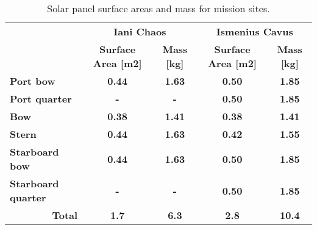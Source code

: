 \begin{table}[h]
\footnotesize
\centering
\caption[Solar panel surface areas and mass for mission sites]
    {Solar panel surface areas and mass for mission sites.}
\label{tab:solar-panel-surface-areas}
\begin{tabular}{l|c|c|c|c|}
\cline{2-5}
\textbf{} & \multicolumn{2}{c|}{\textbf{Iani Chaos}} & \multicolumn{2}{c|}{\textbf{Ismenius Cavus}} \\ \cline{2-5}
 & \textbf{Surface Area {[}m2{]}} & \textbf{Mass {[}kg{]}} & \textbf{Surface Area {[}m2{]}} & \textbf{Mass {[}kg{]}} \\ \hline
\multicolumn{1}{|l|}{{\color[HTML]{A6DBA0} \textbf{Port bow}}} & {\color[HTML]{A6DBA0} \textbf{0.44}} & {\color[HTML]{A6DBA0} \textbf{1.63}} & {\color[HTML]{A6DBA0} \textbf{0.50}} & {\color[HTML]{A6DBA0} \textbf{1.85}} \\ \hline
\multicolumn{1}{|l|}{{\color[HTML]{5AAE61} \textbf{Port quarter}}} & {\color[HTML]{5AAE61} \textbf{-}} & {\color[HTML]{5AAE61} \textbf{-}} & {\color[HTML]{5AAE61} \textbf{0.50}} & {\color[HTML]{5AAE61} \textbf{1.85}} \\ \hline
\multicolumn{1}{|l|}{{\color[HTML]{F4A582} \textbf{Bow}}} & {\color[HTML]{F4A582} \textbf{0.38}} & {\color[HTML]{F4A582} \textbf{1.41}} & {\color[HTML]{F4A582} \textbf{0.38}} & {\color[HTML]{F4A582} \textbf{1.41}} \\ \hline
\multicolumn{1}{|l|}{{\color[HTML]{D6604D} \textbf{Stern}}} & {\color[HTML]{D6604D} \textbf{0.44}} & {\color[HTML]{D6604D} \textbf{1.63}} & {\color[HTML]{D6604D} \textbf{0.42}} & {\color[HTML]{D6604D} \textbf{1.55}} \\ \hline
\multicolumn{1}{|l|}{{\color[HTML]{92C5DE} \textbf{Starboard bow}}} & {\color[HTML]{92C5DE} \textbf{0.44}} & {\color[HTML]{92C5DE} \textbf{1.63}} & {\color[HTML]{92C5DE} \textbf{0.50}} & {\color[HTML]{92C5DE} \textbf{1.85}} \\ \hline
\multicolumn{1}{|l|}{{\color[HTML]{4393C3} \textbf{Starboard quarter}}} & {\color[HTML]{4393C3} \textbf{-}} & {\color[HTML]{4393C3} \textbf{-}} & {\color[HTML]{4393C3} \textbf{0.50}} & {\color[HTML]{4393C3} \textbf{1.85}} \\ \hline
\multicolumn{1}{|r|}{\textbf{Total}} & \textbf{1.7} & \textbf{6.3} & \textbf{2.8} & \textbf{10.4} \\ \hline
\end{tabular}
\end{table}
